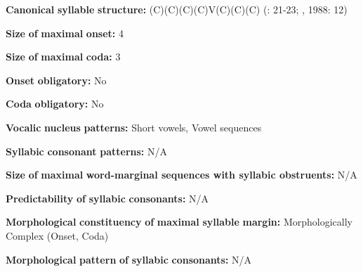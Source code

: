 \begin{styleBody}
\textbf{Canonical} \textbf{syllable} \textbf{structure:} (C)(C)(C)(C)V(C)(C)(C) (\citealt{Bonvillain1973}: 21-23; \citealt{Michelson1981}, 1988: 12)
\end{styleBody}

\begin{styleBody}
\textbf{Size} \textbf{of} \textbf{maximal} \textbf{onset:} 4
\end{styleBody}

\begin{styleBody}
\textbf{Size} \textbf{of} \textbf{maximal} \textbf{coda:} 3
\end{styleBody}

\begin{styleBody}
\textbf{Onset} \textbf{obligatory:} No
\end{styleBody}

\begin{styleBody}
\textbf{Coda} \textbf{obligatory:} No
\end{styleBody}

\begin{styleBody}
\textbf{Vocalic} \textbf{nucleus} \textbf{patterns:} Short vowels, Vowel sequences
\end{styleBody}

\begin{styleBody}
\textbf{Syllabic} \textbf{consonant} \textbf{patterns:} N/A
\end{styleBody}

\begin{styleBody}
\textbf{Size} \textbf{of} \textbf{maximal} \textbf{word{}-marginal sequences with syllabic obstruents:} N/A
\end{styleBody}

\begin{styleBody}
\textbf{Predictability} \textbf{of} \textbf{syllabic} \textbf{consonants:} N/A
\end{styleBody}

\begin{styleBody}
\textbf{Morphological} \textbf{constituency} \textbf{of} \textbf{maximal} \textbf{syllable} \textbf{margin:} Morphologically Complex (Onset, Coda)
\end{styleBody}

\begin{styleBody}
\textbf{Morphological} \textbf{pattern} \textbf{of} \textbf{syllabic} \textbf{consonants:} N/A
\end{styleBody}

